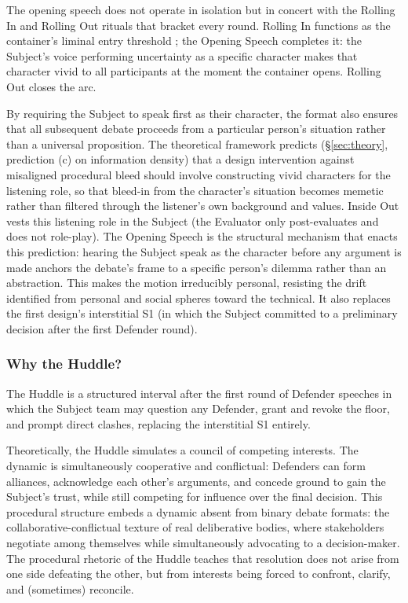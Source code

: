 The opening speech does not operate in isolation but in concert with the Rolling In and Rolling Out rituals that bracket every round. Rolling In functions as the container's liminal entry threshold \parencite{bowman2025transformative}; the Opening Speech completes it: the Subject's voice performing uncertainty as a specific character makes that character vivid to all participants at the moment the container opens. Rolling Out closes the arc.

By requiring the Subject to speak first as their character, the format also ensures that all subsequent debate proceeds from a particular person's situation rather than a universal proposition. The theoretical framework predicts (§\ref{sec:theory}, prediction (c) on information density) that a design intervention against misaligned procedural bleed should involve constructing vivid characters for the listening role, so that bleed-in from the character's situation becomes memetic rather than filtered through the listener's own background and values. Inside Out vests this listening role in the Subject (the Evaluator only post-evaluates and does not role-play). The Opening Speech is the structural mechanism that enacts this prediction: hearing the Subject speak as the character before any argument is made anchors the debate's frame to a specific person's dilemma rather than an abstraction. This makes the motion irreducibly personal, resisting the drift \textcite{goodnight1982spheres} identified from personal and social spheres toward the technical. It also replaces the first design's interstitial S1 (in which the Subject committed to a preliminary decision after the first Defender round).

\subsubsection{Why the Huddle?}

The Huddle is a structured interval after the first round of Defender speeches in which the Subject team may question any Defender, grant and revoke the floor, and prompt direct clashes, replacing the interstitial S1 entirely.

Theoretically, the Huddle simulates a council of competing interests. The dynamic is simultaneously cooperative and conflictual: Defenders can form alliances, acknowledge each other's arguments, and concede ground to gain the Subject's trust, while still competing for influence over the final decision. This procedural structure embeds a dynamic absent from binary debate formats: the collaborative-conflictual texture of real deliberative bodies, where stakeholders negotiate among themselves while simultaneously advocating to a decision-maker. The procedural rhetoric of the Huddle teaches that resolution does not arise from one side defeating the other, but from interests being forced to confront, clarify, and (sometimes) reconcile.

